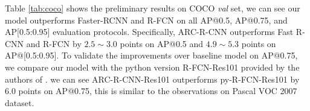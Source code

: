 \documentclass[10pt,twocolumn,letterpaper]{article}
\begin{document}
\begin{table} 
\begin{center}
\end{center}
\caption{Preliminary detection results on MS COCO. $\dag$ \small{https://github.com/Orpine/py-R-FCN}}
\label{tab:coco} 
\vspace{-3mm}
\end{table}

Table \ref{tab:coco} shows the preliminary results on COCO \textit{val} set, we can see our model outperforms Faster-RCNN and R-FCN on all AP@0.5, AP@0.75, and AP[0.5:0.95] evaluation protocols.
Specifically, ARC-R-CNN outperforms Fast R-CNN and R-FCN by $2.5 \sim 3.0$ points on AP@0.5 and $4.9 \sim 5.3$ points on AP@[0.5:0.95].
To validate the improvements over baseline model on AP@0.75, we compare our model with the python version R-FCN-Res101 provided by the authors of \cite{rfcn}.
we can see ARC-R-CNN-Res101 outperforms py-R-FCN-Res101 by $6.0$ points on AP@0.75, this is similar to the observations on Pascal VOC 2007 dataset.

\vspace{-1mm}
\end{document}
